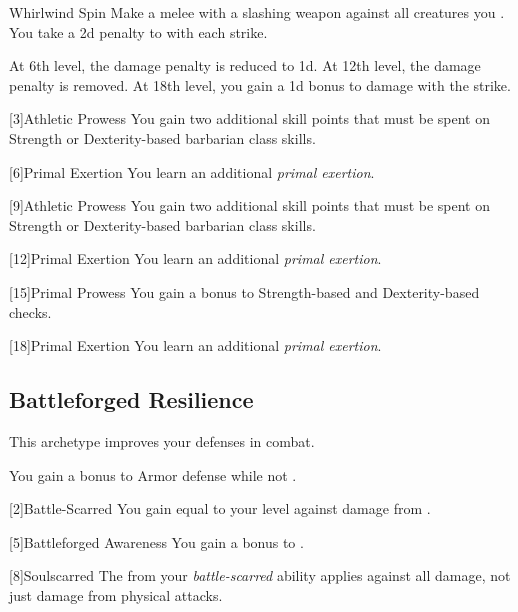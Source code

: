 {            \begin{ability}{Whirlwind Spin}
                Make a melee  with a slashing weapon against all creatures you .
                You take a \minus2d penalty to  with each strike.

                At 6th level, the damage penalty is reduced to \minus1d.
                At 12th level, the damage penalty is removed.
                At 18th level, you gain a \plus1d bonus to damage with the strike.
            \end{ability}
        }

        [3]{Athletic Prowess} You gain two additional skill points that must be spent on Strength or Dexterity-based barbarian class skills.

        [6]{Primal Exertion}
        You learn an additional \textit{primal exertion}.

        [9]{Athletic Prowess} You gain two additional skill points that must be spent on Strength or Dexterity-based barbarian class skills.

        [12]{Primal Exertion}
        You learn an additional \textit{primal exertion}.

        [15]{Primal Prowess}
        You gain a  bonus to Strength-based and Dexterity-based checks.

        [18]{Primal Exertion}
        You learn an additional \textit{primal exertion}.

    \subsection{Battleforged Resilience}
        This archetype improves your defenses in combat.

         You gain a  bonus to Armor defense while not .

        [2]{Battle-Scarred} You gain  equal to your level against damage from .

        [5]{Battleforged Awareness} You gain a  bonus to .

        [8]{Soulscarred} The  from your \textit{battle-scarred} ability applies against all damage, not just damage from physical attacks.

